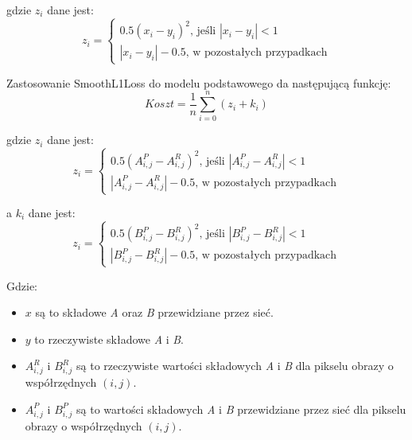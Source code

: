 \begin{enumerate}[leftmargin=*]
  \noindent
  gdzie $z_{i}$ dane jest:
  \begin{equation}
  z_{i} = \begin{cases}
               0.5(x_{i} - y_{i})^2 \text{, jeśli } |x_{i} - y_{i}| < 1 \\
               |x_{i} - y_{i}| - 0.5 \text{, w pozostałych przypadkach}
            \end{cases}
  \end{equation}

  \noindent
  Zastosowanie SmoothL1Loss do modelu podstawowego da następującą funkcję:
  \begin{equation}
  Koszt = \frac{1}{n}\sum_{i=0}^{n} (z_{i} + k_{i})
  \end{equation}

  \noindent
  gdzie $z_{i}$ dane jest:
  \begin{equation}
  z_{i} = \begin{cases}
               0.5(A_{i, j}^{P} - A_{i, j}^{R})^2 \text{, jeśli } |A_{i, j}^{P} - A_{i, j}^{R}| < 1 \\
               |A_{i, j}^{P} - A_{i, j}^{R}| - 0.5 \text{, w pozostałych przypadkach}
            \end{cases}
  \end{equation}

  \noindent
  a $k_{i}$ dane jest:
  \begin{equation}
  z_{i} = \begin{cases}
               0.5(B_{i, j}^{P} - B_{i, j}^{R})^2 \text{, jeśli } |B_{i, j}^{P} - B_{i, j}^{R}| < 1 \\
               |B_{i, j}^{P} - B_{i, j}^{R}| - 0.5 \text{, w pozostałych przypadkach}
            \end{cases}
  \end{equation}

  \end{enumerate}
  \noindent
  Gdzie:
  \begin{itemize}
    \item $x$ są to składowe \textit{A} oraz \textit{B} przewidziane przez sieć.
    \item $y$ to rzeczywiste składowe \textit{A} i \textit{B}.
    \item $A_{i, j}^{R}$ i $B_{i, j}^{R}$ są to rzeczywiste wartości składowych
    \textit{A} i \textit{B} dla pikselu obrazy o współrzędnych $(i, j)$.
    \item $A_{i, j}^{P}$ i $B_{i, j}^{P}$ są to wartości składowych
    \textit{A} i \textit{B} przewidziane przez sieć dla pikselu obrazy o
    współrzędnych $(i, j)$.
  \end{itemize}

